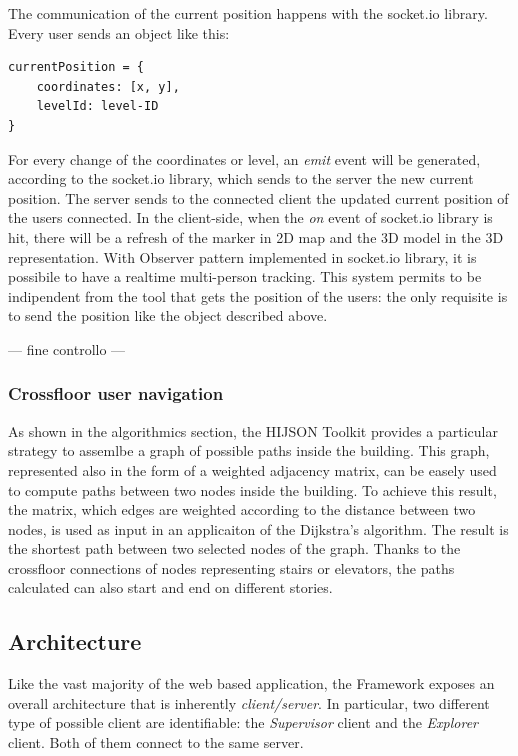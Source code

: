 \documentclass{sig-alternate}
\begin{document}
The communication of the current position happens with the socket.io
library. Every user sends an object like this:

\begin{verbatim}
currentPosition = {
    coordinates: [x, y],
    levelId: level-ID  
}
\end{verbatim}

For every change of the coordinates or level, an \emph{emit} event will
be generated, according to the socket.io library, which sends to the
server the new current position. The server sends to the connected
client the updated current position of the users connected. In the
client-side, when the \emph{on} event of socket.io library is hit, there
will be a refresh of the marker in 2D map and the 3D model in the 3D
representation. With Observer pattern implemented in socket.io library,
it is possibile to have a realtime multi-person tracking. This system
permits to be indipendent from the tool that gets the position of the
users: the only requisite is to send the position like the object
described above.

--- fine controllo ---

\subsubsection{Crossfloor user navigation}\label{crossfloor-user-navigation}

As shown in the algorithmics section, the HIJSON Toolkit provides a particular
strategy  to assemlbe a graph of possible paths inside the building. This
graph, represented also  in the form of a weighted adjacency matrix, can be
easely used to compute paths between  two nodes inside the building. To
achieve this result, the matrix, which edges are weighted  according to the
distance between two nodes, is used as input in an applicaiton of the
Dijkstra's algorithm. The result is the shortest path between two selected
nodes of the graph.  Thanks to the crossfloor connections of nodes
representing stairs or elevators, the paths  calculated can also start and end
on different stories.

\subsection{Architecture}\label{architecture}

Like the vast majority of the web based application, the Framework exposes an
overall architecture that is inherently \emph{client/server}. In particular,
two different type of possible client are identifiable: the \emph{Supervisor}
client and the \emph{Explorer} client. Both of them connect to the same
server.
\end{document}
